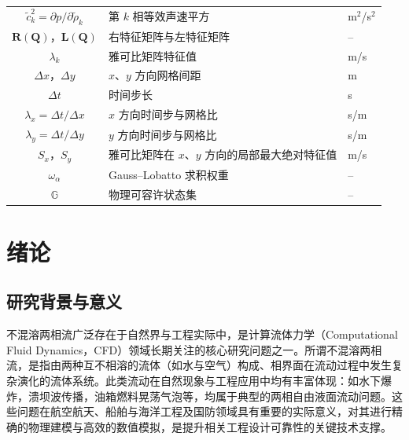 \documentclass[12pt,a4paper]{article}
\numberwithin{equation}{section}    %
\begin{document}
\begin{table}[!htbp]
\begin{tabular}{cll}
        $\tilde{c}_k^2 = \partial p/\partial\tilde{\rho}_k$ & 第 $k$ 相等效声速平方 & m$^2$/s$^2$ \\
        $\bm{R}(\bm{Q})$，$\bm{L}(\bm{Q})$ & 右特征矩阵与左特征矩阵 & -- \\
        $\lambda_k$ & 雅可比矩阵特征值 & m/s \\
        $\Delta x$，$\Delta y$ & $x$、$y$ 方向网格间距 & m \\
        $\Delta t$ & 时间步长 & s \\
        $\lambda_x = \Delta t/\Delta x$ & $x$ 方向时间步与网格比 & s/m \\
        $\lambda_y = \Delta t/\Delta y$ & $y$ 方向时间步与网格比 & s/m \\
        $S_x$，$S_y$ & 雅可比矩阵在 $x$、$y$ 方向的局部最大绝对特征值 & m/s \\
        $\omega_\alpha$ & Gauss--Lobatto 求积权重 & -- \\
        $\mathbb{G}$ & 物理可容许状态集 & -- \\
        \bottomrule
    \end{tabular}
\end{table}

\cleardoublepage

\section{绪论}
\subsection{研究背景与意义}

不混溶两相流广泛存在于自然界与工程实际中，是计算流体力学（Computational Fluid Dynamics，CFD）领域长期关注的核心研究问题之一。所谓不混溶两相流，是指由两种互不相溶的流体（如水与空气）构成、相界面在流动过程中发生复杂演化的流体系统。此类流动在自然现象与工程应用中均有丰富体现：如水下爆炸，溃坝波传播，油箱燃料晃荡气泡等，均属于典型的两相自由液面流动问题\cite{drew1982mathematical,stewart1984two}。这些问题在航空航天、船舶与海洋工程及国防领域具有重要的实际意义，对其进行精确的物理建模与高效的数值模拟，是提升相关工程设计可靠性的关键技术支撑。

\end{document}
